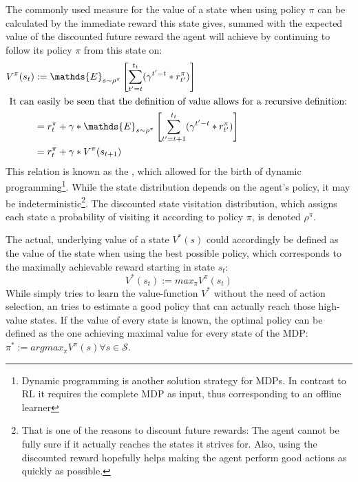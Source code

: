 The commonly used measure for the value of a state when using policy $\pi$ can be calculated by the immediate reward this state gives, summed with the expected value of the discounted future reward the agent will achieve by continuing to follow its policy $\pi$ from this state on:
\begin{align} 
	V^\pi(s_t) &:= \mathds{E}_{s\sim\rho^\pi} \left[  \sum_{t'=t}^{t_t} ( \gamma^{t'-t} * r^\pi_{t'} ) \right]  \label{eq:valuedefinition} \\
\intertext{	
It can easily be seen that the definition of value allows for a recursive definition:
}
	&= r_t^\pi + \gamma * \mathds{E}_{s\sim\rho^\pi} \left[  \sum_{t'=t+1}^{t_t} ( \gamma^{t'-t} * r^\pi_{t'} ) \right]  \nonumber \\
	&= r_t^\pi + \gamma * V^\pi(s_{t+1}) \label{statebellman}
\end{align}
This relation is known as the , which allowed for the birth of dynamic programming\footnote{Dynamic programming is another solution strategy for MDPs. In contrast to RL it requires the complete MDP as input, thus corresponding to an offline learner}. While the state distribution depends on the agent's policy, it may be indeterministic\footnote{That is one of the reasons to discount future rewards: The agent cannot be fully sure if it actually reaches the states it strives for. Also, using the discounted reward hopefully helps making the agent perform good actions as quickly as possible.}. The discounted state visitation distribution, which assigns each state a probability of visiting it according to policy $\pi$, is denoted $\rho^\pi$. 

The actual, underlying value of a state $V^*(s)$ could accordingly be defined as the value of the state when using the best possible policy, which corresponds to the maximally achievable reward starting in state $s_t$:
\begin{equation*} 
V^*(s_t) := max_\pi V^\pi(s_t)
\end{equation*}
While  simply tries to learn the value-function $V^*$ without the need of action selection, an  tries to estimate a good policy that can actually reach those high-value states. If the value of every state is known, the optimal policy can be defined as the one achieving maximal value for every state of the MDP: \mbox{$\pi^* := argmax_\pi V^\pi(s) \forall s \in \mathcal{S}$}. 


